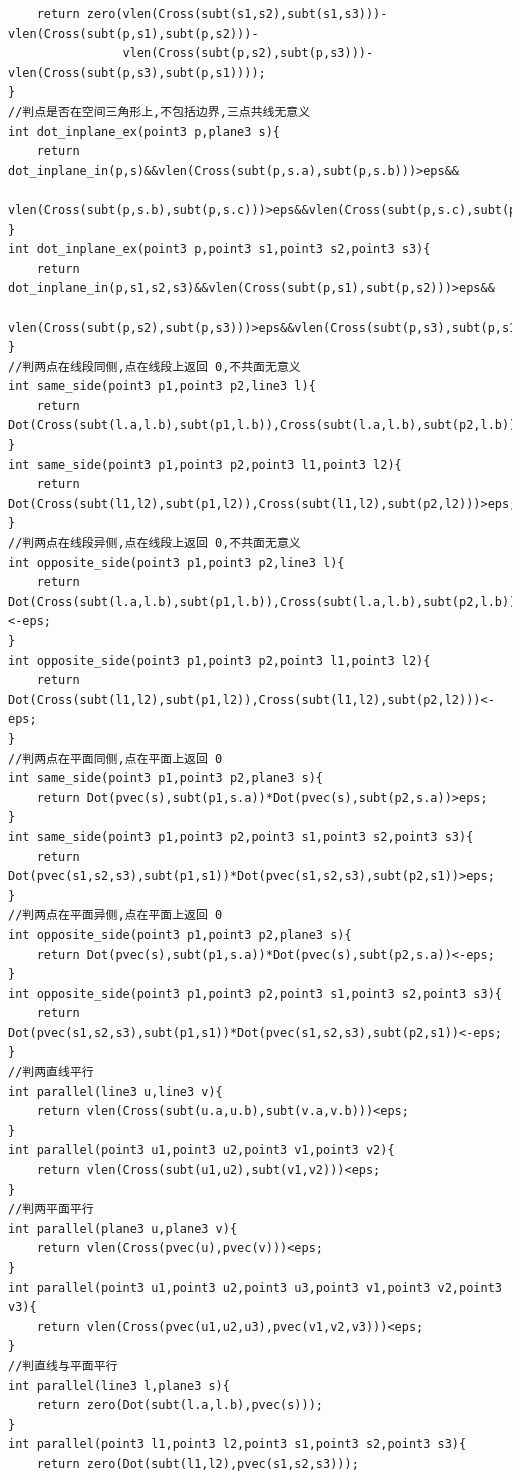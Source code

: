 \documentclass[twoside]{article}
\begin{document}
\begin{lstlisting}
    return zero(vlen(Cross(subt(s1,s2),subt(s1,s3)))-vlen(Cross(subt(p,s1),subt(p,s2)))-
                vlen(Cross(subt(p,s2),subt(p,s3)))-vlen(Cross(subt(p,s3),subt(p,s1))));
}
//判点是否在空间三角形上,不包括边界,三点共线无意义 
int dot_inplane_ex(point3 p,plane3 s){
    return dot_inplane_in(p,s)&&vlen(Cross(subt(p,s.a),subt(p,s.b)))>eps&&
           vlen(Cross(subt(p,s.b),subt(p,s.c)))>eps&&vlen(Cross(subt(p,s.c),subt(p,s.a)))>eps;
}
int dot_inplane_ex(point3 p,point3 s1,point3 s2,point3 s3){
    return dot_inplane_in(p,s1,s2,s3)&&vlen(Cross(subt(p,s1),subt(p,s2)))>eps&&
           vlen(Cross(subt(p,s2),subt(p,s3)))>eps&&vlen(Cross(subt(p,s3),subt(p,s1)))>eps;
}
//判两点在线段同侧,点在线段上返回 0,不共面无意义 
int same_side(point3 p1,point3 p2,line3 l){
    return Dot(Cross(subt(l.a,l.b),subt(p1,l.b)),Cross(subt(l.a,l.b),subt(p2,l.b)))>eps;
}
int same_side(point3 p1,point3 p2,point3 l1,point3 l2){
    return Dot(Cross(subt(l1,l2),subt(p1,l2)),Cross(subt(l1,l2),subt(p2,l2)))>eps;
}
//判两点在线段异侧,点在线段上返回 0,不共面无意义 
int opposite_side(point3 p1,point3 p2,line3 l){
    return Dot(Cross(subt(l.a,l.b),subt(p1,l.b)),Cross(subt(l.a,l.b),subt(p2,l.b)))<-eps;
}
int opposite_side(point3 p1,point3 p2,point3 l1,point3 l2){
    return Dot(Cross(subt(l1,l2),subt(p1,l2)),Cross(subt(l1,l2),subt(p2,l2)))<-eps;
}
//判两点在平面同侧,点在平面上返回 0 
int same_side(point3 p1,point3 p2,plane3 s){
    return Dot(pvec(s),subt(p1,s.a))*Dot(pvec(s),subt(p2,s.a))>eps;
}
int same_side(point3 p1,point3 p2,point3 s1,point3 s2,point3 s3){
    return Dot(pvec(s1,s2,s3),subt(p1,s1))*Dot(pvec(s1,s2,s3),subt(p2,s1))>eps;
}
//判两点在平面异侧,点在平面上返回 0 
int opposite_side(point3 p1,point3 p2,plane3 s){
    return Dot(pvec(s),subt(p1,s.a))*Dot(pvec(s),subt(p2,s.a))<-eps;
}
int opposite_side(point3 p1,point3 p2,point3 s1,point3 s2,point3 s3){
    return Dot(pvec(s1,s2,s3),subt(p1,s1))*Dot(pvec(s1,s2,s3),subt(p2,s1))<-eps;
}
//判两直线平行 
int parallel(line3 u,line3 v){
    return vlen(Cross(subt(u.a,u.b),subt(v.a,v.b)))<eps;
}
int parallel(point3 u1,point3 u2,point3 v1,point3 v2){
    return vlen(Cross(subt(u1,u2),subt(v1,v2)))<eps;
}
//判两平面平行 
int parallel(plane3 u,plane3 v){
    return vlen(Cross(pvec(u),pvec(v)))<eps;
}
int parallel(point3 u1,point3 u2,point3 u3,point3 v1,point3 v2,point3 v3){
    return vlen(Cross(pvec(u1,u2,u3),pvec(v1,v2,v3)))<eps;
}
//判直线与平面平行 
int parallel(line3 l,plane3 s){
    return zero(Dot(subt(l.a,l.b),pvec(s)));
}
int parallel(point3 l1,point3 l2,point3 s1,point3 s2,point3 s3){
    return zero(Dot(subt(l1,l2),pvec(s1,s2,s3)));

\end{lstlisting}
\end{document}
